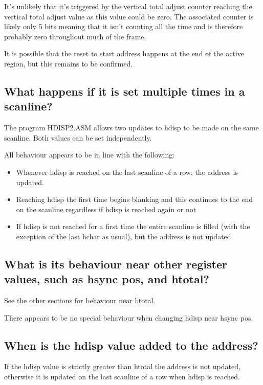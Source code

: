 \documentclass[a4paper,10pt]{amsart}
\begin{document}
It's unlikely that it's triggered by the vertical total adjust counter reaching
the vertical total adjust value as this value could be zero. The associated
counter is likely only 5 bits meaning that it isn't counting all the time and is
therefore probably zero throughout much of the frame.

It is possible that the reset to start address happens at the end of the active
region, but this remains to be confirmed.

\subsection{What happens if it is set multiple times in a scanline?}

The program HDISP2.ASM allows two updates to hdisp to be made on the same
scanline. Both values can be set independently.

All behaviour appears to be in line with the following:

\begin{itemize}
\item Whenever hdisp is reached on the last scanline of a row, the address is
      updated.
\item Reaching hdisp the first time begins blanking and this continues to the
      end on the scanline regardless if hdisp is reached again or not
\item If hdisp is not reached for a first time the entire scanline is filled
      (with the exception of the last hchar as usual), but the address is not
      updated
\end{itemize}

\subsection{What is its behaviour near other register values, such as hsync pos,
and htotal?}

See the other sections for behaviour near htotal.

There appears to be no special behaviour when changing hdisp near hsync pos.

\subsection{When is the hdisp value added to the address?}

If the hdisp value is strictly greater than htotal the address is not updated,
otherwise it is updated on the last scanline of a row when hdisp is reached.
\end{document}
